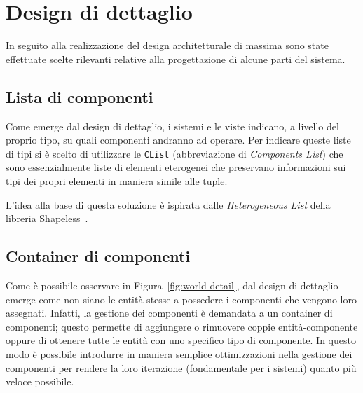 \chapter{Design di dettaglio}\label{ch:design-di-dettaglio}
In seguito alla realizzazione del design architetturale di massima sono state effettuate scelte rilevanti
relative alla progettazione di alcune parti del sistema.

\section{Lista di componenti}\label{sec:lista-di-componenti}
Come emerge dal design di dettaglio, i sistemi e le viste indicano, a livello del proprio tipo, su quali
componenti andranno ad operare.
Per indicare queste liste di tipi si è scelto di utilizzare le \texttt{CList} (abbreviazione di \textit{Components List})
che sono essenzialmente liste di elementi eterogenei che preservano informazioni sui tipi dei propri elementi in maniera
simile alle tuple.

L’idea alla base di questa soluzione è ispirata dalle \textit{Heterogeneous List} della libreria
Shapeless~\cite{shapeless}.

\section{Container di componenti}\label{sec:container-di-componenti}
Come è possibile osservare in Figura~\ref{fig:world-detail}, dal design di dettaglio emerge come
non siano le entità stesse a possedere i componenti che vengono loro assegnati.
Infatti, la gestione dei componenti è demandata a un container di componenti;
questo permette di aggiungere o rimuovere coppie entità-componente oppure di ottenere tutte le entità con uno specifico
tipo di componente.
In questo modo è possibile introdurre in maniera semplice ottimizzazioni nella gestione dei
componenti per rendere la loro iterazione (fondamentale per i sistemi) quanto più veloce possibile.

